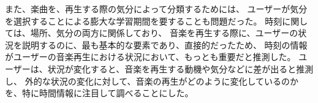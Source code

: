 \documentclass[a4paper, 11pt, onecolumn, report]{jsarticle}
\begin{document}
また、楽曲を、再生する際の気分によって分類するためには、
ユーザーが気分を選択することによる膨大な学習期間を要することも問題だった。
時刻に関しては、場所、気分の両方に関係しており、
音楽を再生する際に、ユーザーの状況を説明するのに、最も基本的な要素であり、直接的だったため、
時刻の情報がユーザーの音楽再生における状況において、もっとも重要だと推測した。
ユーザーは、状況が変化すると、音楽を再生する動機や気分などに差が出ると推測し、
外的な状況の変化に対して、音楽の再生がどのように変化しているのかを、特に時間情報に注目して調べることにした。


%

\end{document}
